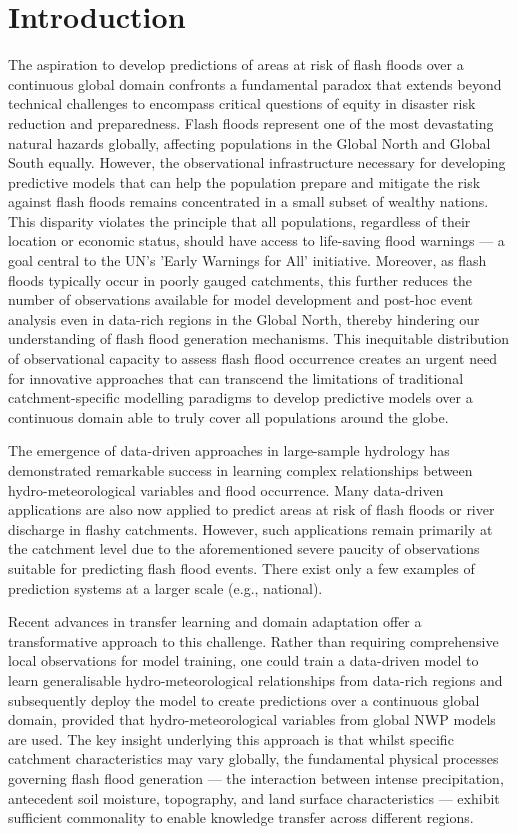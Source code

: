 \section{Introduction}
\label{regional_to_global_training_introduction}

The aspiration to develop predictions of areas at risk of flash floods over a continuous global domain confronts a fundamental paradox that extends beyond technical challenges to encompass critical questions of equity in disaster risk reduction and preparedness. Flash floods represent one of the most devastating natural hazards globally, affecting populations in the Global North and Global South equally. However, the observational infrastructure necessary for developing predictive models that can help the population prepare and mitigate the risk against flash floods remains concentrated in a small subset of wealthy nations. This disparity violates the principle that all populations, regardless of their location or economic status, should have access to life-saving flood warnings — a goal central to the UN's 'Early Warnings for All' initiative. Moreover, as flash floods typically occur in poorly gauged catchments, this further reduces the number of observations available for model development and post-hoc event analysis even in data-rich regions in the Global North, thereby hindering our understanding of flash flood generation mechanisms. This inequitable distribution of observational capacity to assess flash flood occurrence creates an urgent need for innovative approaches that can transcend the limitations of traditional catchment-specific modelling paradigms to develop predictive models over a continuous domain able to truly cover all populations around the globe.

The emergence of data-driven approaches in large-sample hydrology has demonstrated remarkable success in learning complex relationships between hydro-meteorological variables and flood occurrence. Many data-driven applications are also now applied to predict areas at risk of flash floods or river discharge in flashy catchments. However, such applications remain primarily at the catchment level due to the aforementioned severe paucity of observations suitable for predicting flash flood events. There exist only a few examples of prediction systems at a larger scale (e.g., national).

Recent advances in transfer learning and domain adaptation offer a transformative approach to this challenge. Rather than requiring comprehensive local observations for model training, one could train a data-driven model to learn generalisable hydro-meteorological relationships from data-rich regions and subsequently deploy the model to create predictions over a continuous global domain, provided that hydro-meteorological variables from global NWP models are used. The key insight underlying this approach is that whilst specific catchment characteristics may vary globally, the fundamental physical processes governing flash flood generation — the interaction between intense precipitation, antecedent soil moisture, topography, and land surface characteristics — exhibit sufficient commonality to enable knowledge transfer across different regions.

